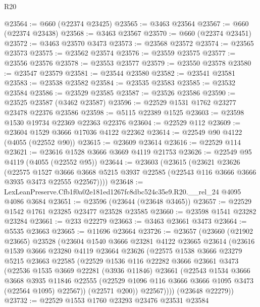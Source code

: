 \begin{lexlean}{R20}
\begin{coremodule}
@23564 := @660 (@22374 @23425)
@23565 := @3463 @23564
@23567 := @660 (@22374 @23438)
@23568 := @3463 @23567
@23570 := @660 (@22374 @23451)
@23572 := @3463 @23570 @3473
@23573 := @23568 @23572
@23574 := @23565 @23573
@23575 := @23562 @23574
@23576 := @23559 @23575
@23577 := @23556 @23576
@23578 := @23553 @23577
@23579 := @23550 @23578
@23580 := @23547 @23579
@23581 := @23544 @23580
@23582 := @23541 @23581
@23583 := @23538 @23582
@23584 := @23535 @23583
@23585 := @23532 @23584
@23586 := @23529 @23585
@23587 := @23526 @23586
@23590 := @23525 @23587 (@3462 @23587)
@23596 := @22529 @1531 @1762 @23277 @23478 @22376 @23586
@23598 := @5115 @22389 @1525
@23603 := @23598 @1530 @19734 @22369 @22363 @22376
@23604 := @22529 @112
@23609 := @23604 @1529 @3666 @17036 @4122 @22362
@23614 := @22549 @90 @4122 (@4055 (@22552 @90))
@23615 := @23609 @23614
@23616 := @22529 @114
@23621 := @23616 @1528 @3666 @3669 @4119 @21753
@23626 := @22549 @95 @4119 (@4055 (@22552 @95))
@23644 := @23603
    (@23615
      (@23621
        @23626
        (@22575
          @1527
          @3666
          @3668
          @5215
          @3937
          @22585
          (@22543 @116 @3666 @3666 @3935 @3473 @22555 @22567))))
@23648 := LexLeanPreserve.Cfb1f0a02e181ed1267fc8dbc524c35e9.R20.__rel_24 @4095 @4086 @3684
@23651 := @23596 (@23644 (@23648 @3465))
@23657 := @22529 @1542 @1761 @23285 @23477 @23528 @23585
@23660 := @23598 @1541 @23282 @23284
@23661 := @233 @22279
@23663 := @3463 @23661 @3473
@23664 := @5535 @23663
@23665 := @11696 @23664
@23726 := @23657
    (@23660
      (@21902 @23665)
      @23528
      (@23604
        @1540
        @3666
        @23281
        @4122
        @23665
        @23614
        (@23616
          @1539
          @3666
          @23280
          @4119
          @23664
          @23626
          (@22575
            @1538
            @3666
            @23279
            @5215
            @23663
            @22585
            (@22529
              @1536
              @116
              @22282
              @3666
              @23661
              @3473
              (@22536
                @1535
                @3669
                @22281
                (@3936 @11846)
                @23661
                (@22543
                  @1534
                  @3666
                  @3668
                  @3935
                  @11846
                  @22555
                  (@22529 @1096 @116 @3666 @3666 @1095 @3473 (@22564 @1095) @22567))
                (@22571 @200))
              @22567))))
      (@23648 @22279))
@23732 := @22529 @1553 @1760 @23293 @23476 @23531 @23584

\end{coremodule}
\end{lexlean}
